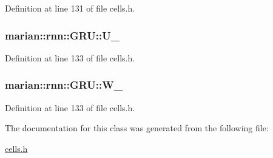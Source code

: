 Definition at line 131 of file cells.\+h.

\subsubsection[{\texorpdfstring{U\+\_\+}{U_}}]{ marian\+::rnn\+::\+G\+R\+U\+::\+U\+\_\+\hspace{0.3cm}{\ttfamily [protected]}}\hypertarget{classmarian_1_1rnn_1_1GRU_a3e2ad5f403491468b529e60a95be47d2}{}\label{classmarian_1_1rnn_1_1GRU_a3e2ad5f403491468b529e60a95be47d2}


Definition at line 133 of file cells.\+h.

\subsubsection[{\texorpdfstring{W\+\_\+}{W_}}]{ marian\+::rnn\+::\+G\+R\+U\+::\+W\+\_\+\hspace{0.3cm}{\ttfamily [protected]}}\hypertarget{classmarian_1_1rnn_1_1GRU_ab1d7208cfab36cde27cf922b197a6314}{}\label{classmarian_1_1rnn_1_1GRU_ab1d7208cfab36cde27cf922b197a6314}


Definition at line 133 of file cells.\+h.



The documentation for this class was generated from the following file\+:\begin{DoxyCompactItemize}
\item 
\hyperlink{cells_8h}{cells.\+h}\end{DoxyCompactItemize}
